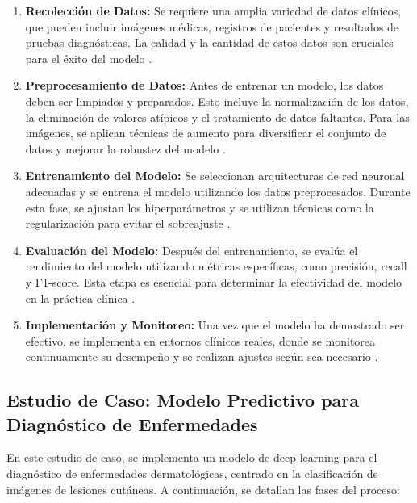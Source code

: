 \documentclass{article}
\begin{document}
\begin{enumerate}
	\item \textbf{Recolección de Datos:} Se requiere una amplia variedad de datos clínicos, que pueden incluir imágenes médicas, registros de pacientes y resultados de pruebas diagnósticas. La calidad y la cantidad de estos datos son cruciales para el éxito del modelo \cite{litjens2017survey}.
	
	\item \textbf{Preprocesamiento de Datos:} Antes de entrenar un modelo, los datos deben ser limpiados y preparados. Esto incluye la normalización de los datos, la eliminación de valores atípicos y el tratamiento de datos faltantes. Para las imágenes, se aplican técnicas de aumento para diversificar el conjunto de datos y mejorar la robustez del modelo \cite{miotto2018deep}.
	
	\item \textbf{Entrenamiento del Modelo:} Se seleccionan arquitecturas de red neuronal adecuadas y se entrena el modelo utilizando los datos preprocesados. Durante esta fase, se ajustan los hiperparámetros y se utilizan técnicas como la regularización para evitar el sobreajuste \cite{hamoud2018clinical}.
	
	\item \textbf{Evaluación del Modelo:} Después del entrenamiento, se evalúa el rendimiento del modelo utilizando métricas específicas, como precisión, recall y F1-score. Esta etapa es esencial para determinar la efectividad del modelo en la práctica clínica \cite{esteva2017dermatologist}.
	
	\item \textbf{Implementación y Monitoreo:} Una vez que el modelo ha demostrado ser efectivo, se implementa en entornos clínicos reales, donde se monitorea continuamente su desempeño y se realizan ajustes según sea necesario \cite{shickel2017deep}.
\end{enumerate}

\subsection{Estudio de Caso: Modelo Predictivo para Diagnóstico de Enfermedades}
En este estudio de caso, se implementa un modelo de deep learning para el diagnóstico de enfermedades dermatológicas, centrado en la clasificación de imágenes de lesiones cutáneas. A continuación, se detallan las fases del proceso:
\end{document}

